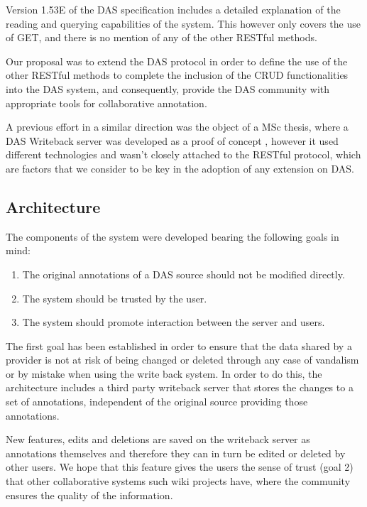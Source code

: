 Version 1.53E of the DAS specification includes a detailed explanation of the reading and querying capabilities of the system. This however only covers the use of GET, and there is no mention of any of the other RESTful methods.

Our proposal was to extend the DAS protocol in order to define the use of the other RESTful methods to complete the inclusion of the CRUD functionalities into the DAS system, and consequently, provide the DAS community with appropriate tools for collaborative annotation.

A previous effort in a similar direction was the object of a MSc thesis, where a DAS Writeback server was developed as a proof of concept \cite{GRZ2008}, however it used different technologies and wasn't closely attached to the RESTful protocol, which are factors that we consider to be key in the adoption of any extension on DAS.

\subsection{Architecture}
The components of the system were developed bearing the following goals in mind:

\begin{enumerate}
\setlength\itemsep{-0.5em}
\item The original annotations of a DAS source should not be modified directly.
\item The system should be trusted by the user.
\item The system should promote interaction between the server and users.
\end{enumerate}

The first goal has been established in order to ensure that the data shared by a provider is not at risk of being changed or deleted through any case of vandalism or by mistake when using the write back system. In order to do this, the architecture includes a third party writeback server that stores the changes to a set of annotations, independent of the original source providing those annotations. 

New features, edits and deletions are saved on the writeback server as annotations themselves and therefore they can in turn be edited or deleted by other users. We hope that this feature gives the users the sense of trust (goal 2) that other collaborative systems such wiki projects have, where the community ensures the quality of the information. 

